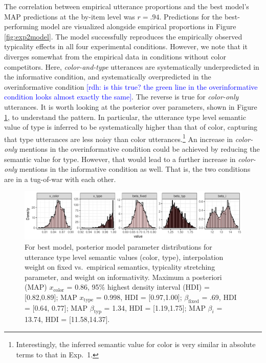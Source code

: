 \documentclass[11pt]{article}
\newcommand{\rdh}[1]{\textcolor{Blue}{[rdh: #1]}}
\newcommand{\figref}[1]{Figure \ref{#1}}
\begin{document}
The correlation between empirical utterance proportions and the best model's MAP predictions at the by-item level was $r=.94$. Predictions for the best-performing model are visualized alongside empirical proportions in \figref{fig:exp2model}. The model successfully reproduces the empirically observed typicality effects in all four experimental conditions. However, we note that it diverges somewhat from the empirical data in conditions without color competitors. Here, \emph{color-and-type} utterances are systematically underpredicted in the informative condition, and systematically overpredicted in the overinformative condition \rdh{is this true? the green line in the overinformative condition looks almost exactly the same}. The reverse is true for \emph{color-only} utterances. It is worth looking at the posterior over parameters, shown in \figref{fig:typparamposteriors}, to understand the pattern. In particular, the utterance type level semantic value of type is inferred to be systematically higher than that of color, capturing that type utterances are less noisy than color utterances.\footnote{Interestingly, the inferred semantic value for color is very similar in absolute terms to that in Exp.~1.} An increase in \emph{color-only} mentions in the overinformative condition could be achieved by reducing the semantic value for type. However, that would lead to a further increase in \emph{color-only} mentions in the informative condition as well. That is, the two conditions are in a tug-of-war with each other.

\begin{figure}
\centering
\includegraphics[width=\textwidth]{pics/exp2-cost-none-sem-fixedplusempirical-paramposteriors}
\caption{For best model, posterior model parameter distributions for utterance type level semantic values (color, type), interpolation weight on fixed vs.~empirical semantics, typicality stretching parameter, and weight on informativity. Maximum a posteriori (MAP)  $x_{\textrm{color}}$ = 0.86, 95\% highest density interval (HDI) = [0.82,0.89]; MAP $x_{\textrm{type}}$ = 0.998, HDI = [0.97,1.00]; $\beta_{\textrm{fixed}}$ = .69, HDI = [0.64, 0.77]; MAP $\beta_{\textrm{typ}}$ = 1.34, HDI = [1.19,1.75]; MAP $\beta_i$ = 13.74, HDI = [11.58,14.37].}
\label{fig:typparamposteriors}
\end{figure}
\end{document}
